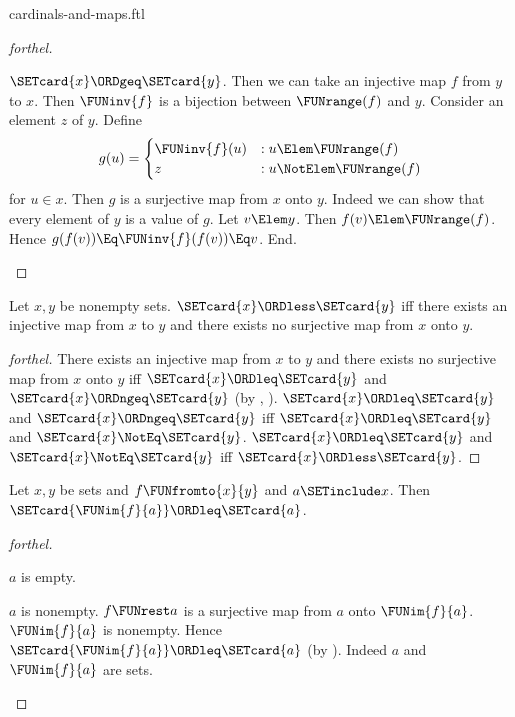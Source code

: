 \documentclass{stex}
\begin{document}
\begin{smodule}{cardinals-and-maps.ftl}
\begin{proof}[forthel]
  \begin{case}{$\SETcard{x} \ORDgeq \SETcard{y}$.}
    Then we can take an injective map $f$ from $y$ to $x$.
    Then $\FUNinv{f}$ is a bijection between $\FUNrange(f)$ and $y$.
    Consider an element $z$ of $y$.
    Define \[ g(u) =
      \begin{cases}
        \FUNinv{f}(u) & : u \Elem \FUNrange(f) \\
        z         & : u \NotElem \FUNrange(f)
      \end{cases} \]
    for $u \in x$.
    Then $g$ is a surjective map from $x$ onto $y$.
    Indeed we can show that every element of $y$ is a value of $g$.
      Let $v \Elem y$.
      Then $f(v) \Elem \FUNrange(f)$.
      Hence $g(f(v)) \Eq \FUNinv{f}(f(v)) \Eq v$.
    End.
  \end{case}
\end{proof}

\begin{proposition}[forthel]
  Let $x, y$ be nonempty sets.
  $\SETcard{x} \ORDless \SETcard{y}$ iff there exists an injective map from $x$ to $y$ and there exists no surjective map from $x$ onto $y$.
\end{proposition}
\begin{proof}[forthel]
  There exists an injective map from $x$ to $y$ and there exists no surjective map from $x$ onto $y$ iff $\SETcard{x} \ORDleq \SETcard{y}$ and $\SETcard{x} \ORDngeq \SETcard{y}$ (by , ).
  $\SETcard{x} \ORDleq \SETcard{y}$ and $\SETcard{x} \ORDngeq \SETcard{y}$ iff $\SETcard{x} \ORDleq \SETcard{y}$ and $\SETcard{x} \NotEq \SETcard{y}$.
  $\SETcard{x} \ORDleq \SETcard{y}$ and $\SETcard{x} \NotEq \SETcard{y}$ iff $\SETcard{x} \ORDless \SETcard{y}$.
\end{proof}


\begin{proposition}[forthel,name=cardinality of image]
  Let $x, y$ be sets and $f \FUNfromto{x}{y}$ and $a \SETinclude x$.
  Then $\SETcard{\FUNim{f}{a}} \ORDleq \SETcard{a}$.
\end{proposition}
\begin{proof}[forthel]
  \begin{case}{$a$ is empty.} \end{case}

  \begin{case}{$a$ is nonempty.}
    $f \FUNrest a$ is a surjective map from $a$ onto $\FUNim{f}{a}$.
    $\FUNim{f}{a}$ is nonempty.
    Hence $\SETcard{\FUNim{f}{a}} \ORDleq \SETcard{a}$ (by ).
    Indeed $a$ and $\FUNim{f}{a}$ are sets.
  \end{case}
\end{proof}
\end{smodule}
\end{document}
